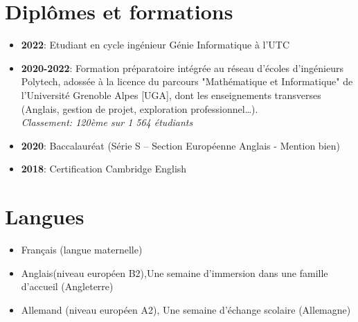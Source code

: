 \documentclass[9pt, oneside, a4paper, titlepage]{extarticle}
\begin{document}
\begin{tcolorbox}
\begin{minipage}[t]{12.8cm}
\begin{tcolorbox}[grow to right by = 0.6cm, colback = gray!25, colframe = white]
                \section*{Diplômes et formations }
                \begin{itemize}
                    \item \textbf{2022}: Etudiant en cycle ingénieur Génie Informatique à l'UTC             
                    \item \textbf{2020-2022}: Formation préparatoire intégrée au réseau d’écoles d’ingénieurs Polytech, adossée à la licence du parcours "Mathématique et Informatique" de l’Université Grenoble Alpes [UGA], dont les enseignements transverses (Anglais, gestion de projet, exploration professionnel\ldots).\\\emph{Classement: 120ème sur 1 564 étudiants}
                    \item \textbf{2020}: Baccalauréat (Série S – Section Européenne Anglais - Mention bien)                 
                    \item \textbf{2018}: Certification Cambridge English
                \end{itemize}

                    \section*{Langues}
                    \begin{itemize}
                        \item Français (langue maternelle)
                        \item Anglais(niveau européen B2),Une semaine d'immersion dans une famille d'accueil (Angleterre)
                        \item Allemand (niveau européen A2), Une semaine d'échange scolaire (Allemagne)
                    \end{itemize}
                    \vspace*{0.1mm}
            \end{tcolorbox}
        \end{minipage}
    \end{tcolorbox}
\end{document}
